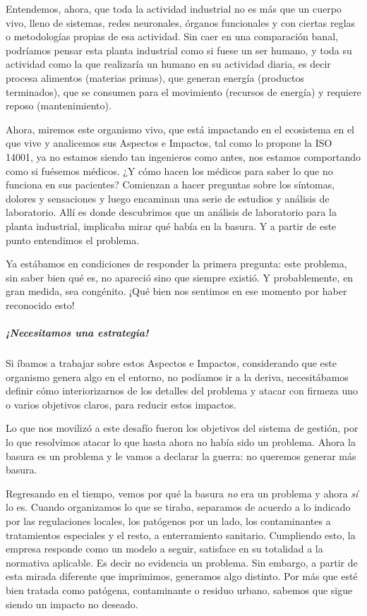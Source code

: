 \documentclass[
]{article}
\begin{document}
Entendemos, ahora, que toda la actividad industrial no es más que un
cuerpo vivo, lleno de sistemas, redes neuronales, órganos funcionales y
con ciertas reglas o metodologías propias de esa actividad. Sin caer en
una comparación banal, podríamos pensar esta planta industrial como si
fuese un ser humano, y toda su actividad como la que realizaría un
humano en su actividad diaria, es decir procesa alimentos (materias
primas), que generan energía (productos terminados), que se consumen
para el movimiento (recursos de energía) y requiere reposo
(mantenimiento).

Ahora, miremos este organismo vivo, que está impactando en el ecosistema
en el que vive y analicemos sus Aspectos e Impactos, tal como lo propone
la ISO 14001, ya no estamos siendo tan ingenieros como antes, nos
estamos comportando como si fuésemos médicos. ¿Y cómo hacen los médicos
para saber lo que no funciona en sus pacientes? Comienzan a hacer
preguntas sobre los síntomas, dolores y sensaciones y luego encaminan
una serie de estudios y análisis de laboratorio. Allí es donde
descubrimos que un análisis de laboratorio para la planta industrial,
implicaba mirar qué había en la basura. Y a partir de este punto
entendimos el problema.

Ya estábamos en condiciones de responder la primera pregunta: este
problema, sin saber bien qué es, no apareció sino que siempre existió. Y
probablemente, en gran medida, sea congénito. ¡Qué bien nos sentimos en
ese momento por haber reconocido esto!

\hypertarget{necesitamos-una-estrategia}{%
\subparagraph{¡Necesitamos una
estrategia!}\label{necesitamos-una-estrategia}}

Si íbamos a trabajar sobre estos Aspectos e Impactos, considerando que
este organismo genera algo en el entorno, no podíamos ir a la deriva,
necesitábamos definir cómo interiorizarnos de los detalles del problema
y atacar con firmeza uno o varios objetivos claros, para reducir estos
impactos.

Lo que nos movilizó a este desafío fueron los objetivos del sistema de
gestión, por lo que resolvimos atacar lo que hasta ahora no había sido
un problema. Ahora la basura es un problema y le vamos a declarar la
guerra: no queremos generar más basura.

Regresando en el tiempo, vemos por qué la basura \emph{no} era un
problema y ahora \emph{sí} lo es. Cuando organizamos lo que se tiraba,
separamos de acuerdo a lo indicado por las regulaciones locales, los
patógenos por un lado, los contaminantes a tratamientos especiales y el
resto, a enterramiento sanitario. Cumpliendo esto, la empresa responde
como un modelo a seguir, satisface en su totalidad a la normativa
aplicable. Es decir no evidencia un problema. Sin embargo, a partir de
esta mirada diferente que imprimimos, generamos algo distinto. Por más
que esté bien tratada como patógena, contaminante o residuo urbano,
sabemos que sigue siendo un impacto no deseado.
\end{document}
